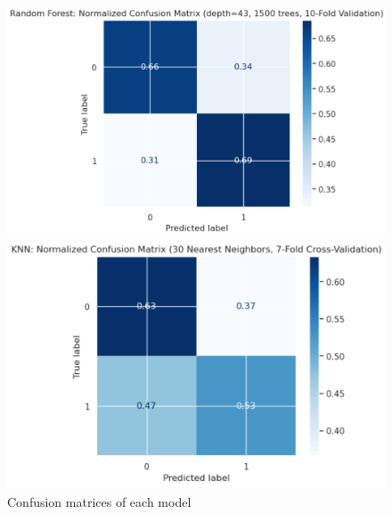 \documentclass{article}
\begin{document}
\begin{figure}[htbp]
\begin{minipage}{.3\textwidth}
\end{minipage}
\begin{minipage}{.4\textwidth}
  \centering
  \includegraphics[width=.95\linewidth]{Figures/RF_cm.png}
\end{minipage}
\begin{minipage}{.4\textwidth}
  \centering
  \includegraphics[width=.9\linewidth]{Figures/KNN_cm.png}
\end{minipage}
\caption{Confusion matrices of each model}
\label{fig:cm}
\end{figure}
\end{document}
